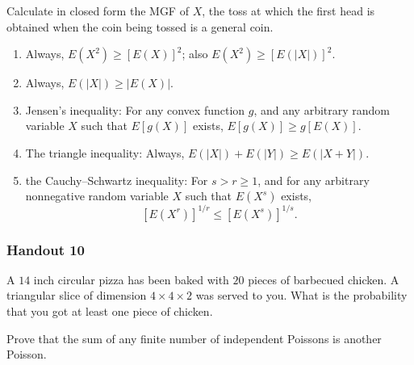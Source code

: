 \begin{problem}[Handout 9, \# 8]
  Calculate in closed form the MGF of \(X\), the toss at which the first
  head is obtained when the coin being tossed is a general coin.
\end{problem}
\begin{solution*}
\end{solution*}

\begin{problem}[Handout 9, \# 15]
  \hfill
  \begin{enumerate}[label=(\alph*),noitemsep]
  \item Always, \(E(X^2)\geq [E(X)]^2\); also \(E(X^2)\geq [E(|X|)]^2\).
  \item Always, \(E(|X|)\geq |E(X)|\).
  \item Jensen's inequality: For any convex function \(g\), and any
    arbitrary random variable \(X\) such that \(E[g(X)]\) exists,
    \(E[g(X)]\geq g[E(X)]\).
  \item The triangle inequality: Always, \(E(|X|)+E(|Y|)\geq E(|X+Y|)\).
  \item the Cauchy--Schwartz inequality: For \(s>r\geq 1\), and for any
    arbitrary nonnegative random variable \(X\) such that \(E(X^s)\)
    exists,
    \[
      [E(X^r)]^{1/r}\leq [E(X^s)]^{1/s}.
    \]
  \end{enumerate}
\end{problem}
\begin{solution*}
\end{solution*}

\subsubsection{Handout 10}
\begin{problem}[Handout 10, \# 3]
  A \(14\) inch circular pizza has been baked with \(20\) pieces of
  barbecued chicken. A triangular slice of dimension \(4\times 4\times 2\)
  was served to you. What is the probability that you got at least one
  piece of chicken.
\end{problem}
\begin{solution*}
\end{solution*}

\begin{problem}[Handout 10, \# 15]
  Prove that the sum of any finite number of independent Poissons is
  another Poisson.
\end{problem}
\begin{solution*}
\end{solution*}

